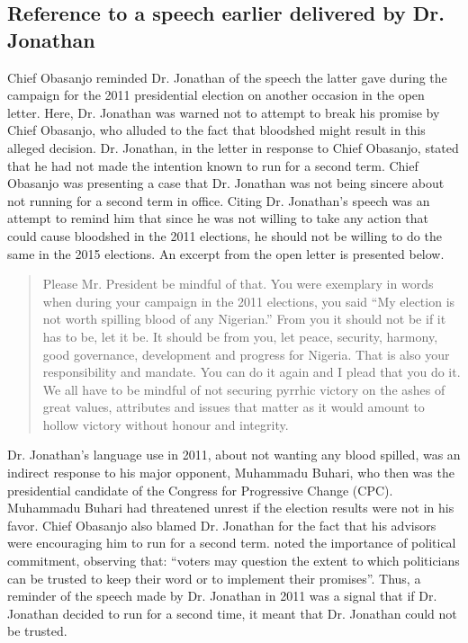 \documentclass[output=paper,colorlinks,citecolor=brown]{langscibook}
\begin{document}
\subsection{Reference to a speech earlier delivered by Dr. Jonathan}

Chief Obasanjo reminded Dr. Jonathan of the speech the latter gave during the campaign for the 2011 presidential election on another occasion in the open letter. Here, Dr. Jonathan was warned not to attempt to break his promise by Chief Obasanjo, who alluded to the fact that bloodshed might result in this alleged decision. Dr. Jonathan, in the letter in response to Chief Obasanjo, stated that he had not made the intention known to run for a second term. Chief Obasanjo was presenting a case that Dr. Jonathan was not being sincere about not running for a second term in office. Citing Dr. Jonathan’s speech was an attempt to remind him that since he was not willing to take any action that could cause bloodshed in the 2011 elections, he should not be willing to do the same in the 2015 elections. An excerpt from the open letter is presented below.

\begin{quote}
Please Mr. President be mindful of that. You were exemplary in words when during your campaign in the 2011 elections, you said “My election is not worth spilling blood of any Nigerian.” From you it should not be if it has to be, let it be. It should be from you, let peace, security, harmony, good governance, development and progress for Nigeria. That is also your responsibility and mandate. You can do it again and I plead that you do it. We all have to be mindful of not securing pyrrhic victory on the ashes of great values, attributes and issues that matter as it would amount to hollow victory without honour and integrity.
\end{quote}

\begin{sloppypar}
Dr. Jonathan’s language use in 2011, about not wanting any blood spilled, was an  indirect response to his major opponent, Muhammadu Buhari, who then was the presidential candidate of the Congress for Progressive Change (CPC). Muhammadu Buhari had threatened unrest if the election results were not in his favor. Chief Obasanjo also blamed Dr. Jonathan for the fact that his advisors were encouraging him to run for a second term. \citet[324]{Bulletal2008} noted the importance of political commitment, observing that: “voters may question the extent to which politicians can be trusted to keep their word or to implement their promises”. Thus, a reminder of the speech made by Dr. Jonathan in 2011 was a signal that if Dr. Jonathan decided to run for a second time, it meant that Dr. Jonathan could not be trusted.
\end{sloppypar}
\end{document}
